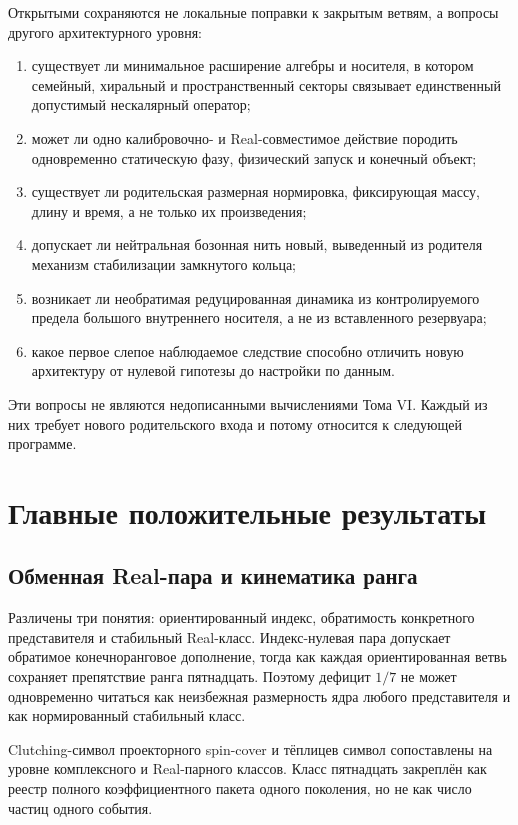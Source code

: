 Открытыми сохраняются не локальные поправки к закрытым ветвям, а вопросы
другого архитектурного уровня:
\begin{enumerate}
 \item существует ли минимальное расширение алгебры и носителя, в котором
 семейный, хиральный и пространственный секторы связывает единственный
 допустимый нескалярный оператор;
 \item может ли одно калибровочно- и Real-совместимое действие породить
 одновременно статическую фазу, физический запуск и конечный объект;
 \item существует ли родительская размерная нормировка, фиксирующая
 массу, длину и время, а не только их произведения;
 \item допускает ли нейтральная бозонная нить новый, выведенный из
 родителя механизм стабилизации замкнутого кольца;
 \item возникает ли необратимая редуцированная динамика из контролируемого
 предела большого внутреннего носителя, а не из вставленного резервуара;
 \item какое первое слепое наблюдаемое следствие способно отличить новую
 архитектуру от нулевой гипотезы до настройки по данным.
\end{enumerate}

Эти вопросы не являются недописанными вычислениями Тома VI. Каждый из
них требует нового родительского входа и потому относится к следующей
программе.

\section{Главные положительные результаты}

\subsection{Обменная Real-пара и кинематика ранга}

Различены три понятия: ориентированный индекс, обратимость конкретного
представителя и стабильный Real-класс. Индекс-нулевая пара допускает
обратимое конечноранговое дополнение, тогда как каждая ориентированная
ветвь сохраняет препятствие ранга пятнадцать. Поэтому дефицит $1/7$ не
может одновременно читаться как неизбежная размерность ядра любого
представителя и как нормированный стабильный класс.

Clutching-символ проекторного spin-cover и тёплицев символ сопоставлены на
уровне комплексного и Real-парного классов. Класс пятнадцать закреплён как
реестр полного коэффициентного пакета одного поколения, но не как число
частиц одного события.

